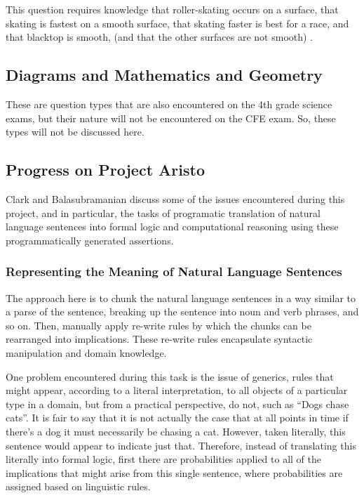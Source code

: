 This question requires knowledge that roller-skating occurs on a surface, that skating is fastest on a smooth surface, that skating faster is best for a race, and that blacktop is smooth, (and that the other surfaces are not smooth) \cite{clark2015elementary}.

\subsection{Diagrams and Mathematics and Geometry}

These are question types that are also encountered on the 4th grade science exams, but their nature will not be encountered on the CFE exam.  So, these types will not be discussed here.

\subsection{Progress on Project Aristo}

Clark and Balasubramanian \cite{clark2014interpreting} discuss some of the issues encountered during this project, and in particular, the tasks of programatic translation of natural language sentences into formal logic and computational reasoning using these programmatically generated assertions.

\subsubsection{Representing the Meaning of Natural Language Sentences}

The approach here is to chunk the natural language sentences in a way similar to a parse of the sentence, breaking up the sentence into noun and verb phrases, and so on.  Then, manually apply re-write rules by which the chunks can be rearranged into implications.  These re-write rules encapsulate syntactic manipulation and domain knowledge.

One problem encountered during this task is the issue of generics, rules that might appear, according to a literal interpretation, to all objects of a particular type in a domain, but from a practical perspective, do not, such as ``Dogs chase cats”.  It is fair to say that it is not actually the case that at all points in time if there’s a dog it must necessarily be chasing a cat.  However, taken literally, this sentence would appear to indicate just that.  Therefore, instead of translating this literally into formal logic, first there are probabilities applied to all of the implications that might arise from this single sentence, where probabilities are assigned based on linguistic rules.

